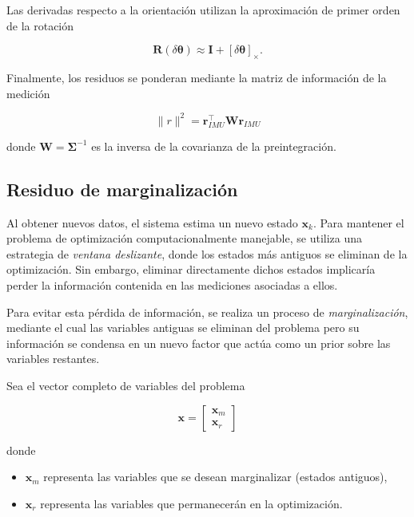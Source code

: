 Las derivadas respecto a la orientación utilizan la aproximación de primer orden de la rotación

\begin{equation}
\mathbf{R}(\delta \boldsymbol{\theta})
\approx
\mathbf{I}
+
[\delta \boldsymbol{\theta}]_\times.
\end{equation}

Finalmente, los residuos se ponderan mediante la matriz de información de la medición

\begin{equation}
\|r\|^2 =
\mathbf{r}_{IMU}^\top
\mathbf{W}
\mathbf{r}_{IMU}
\end{equation}

\noindent donde $\mathbf{W}=\boldsymbol{\Sigma}^{-1}$ es la inversa de la covarianza de la preintegración.



\subsection{Residuo de marginalización}

Al obtener nuevos datos, el sistema estima un nuevo estado $\mathbf{x}_k$. 
Para mantener el problema de optimización computacionalmente manejable, se utiliza 
una estrategia de \textit{ventana deslizante}, donde los estados más antiguos se eliminan 
de la optimización. Sin embargo, eliminar directamente dichos estados implicaría perder 
la información contenida en las mediciones asociadas a ellos. 

Para evitar esta pérdida de información, se realiza un proceso de \textit{marginalización}, 
mediante el cual las variables antiguas se eliminan del problema pero su información se 
condensa en un nuevo factor que actúa como un prior sobre las variables restantes.

Sea el vector completo de variables del problema

\begin{equation}
\mathbf{x} =
\begin{bmatrix}
\mathbf{x}_m \\
\mathbf{x}_r
\end{bmatrix}
\end{equation}

\noindent donde

\begin{itemize}
\item $\mathbf{x}_m$ representa las variables que se desean marginalizar (estados antiguos),
\item $\mathbf{x}_r$ representa las variables que permanecerán en la optimización.
\end{itemize}

